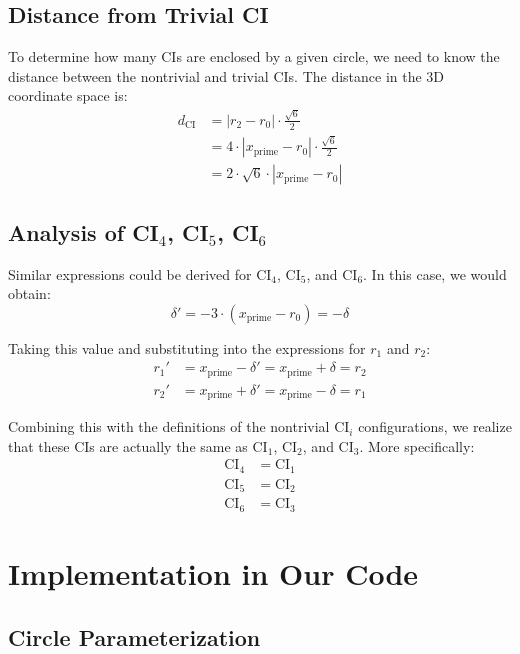 \documentclass{article}
\begin{document}
\subsection{Distance from Trivial CI}

To determine how many CIs are enclosed by a given circle, we need to know the distance between the nontrivial and trivial CIs. The distance in the 3D coordinate space is:
\begin{align}
d_{\text{CI}} &= |r_2 - r_0| \cdot \frac{\sqrt{6}}{2} \\
&= 4 \cdot |x_{\text{prime}} - r_0| \cdot \frac{\sqrt{6}}{2} \\
&= 2 \cdot \sqrt{6} \cdot |x_{\text{prime}} - r_0|
\end{align}

\subsection{Analysis of CI$_4$, CI$_5$, CI$_6$}

Similar expressions could be derived for $\text{CI}_4$, $\text{CI}_5$, and $\text{CI}_6$. In this case, we would obtain:
\begin{equation}
\delta' = -3 \cdot (x_{\text{prime}} - r_0) = -\delta
\end{equation}

Taking this value and substituting into the expressions for $r_1$ and $r_2$:
\begin{align}
r_1' &= x_{\text{prime}} - \delta' = x_{\text{prime}} + \delta = r_2 \\
r_2' &= x_{\text{prime}} + \delta' = x_{\text{prime}} - \delta = r_1
\end{align}

Combining this with the definitions of the nontrivial $\text{CI}_i$ configurations, we realize that these CIs are actually the same as $\text{CI}_1$, $\text{CI}_2$, and $\text{CI}_3$. More specifically:
\begin{align}
\text{CI}_4 &= \text{CI}_1 \\
\text{CI}_5 &= \text{CI}_2 \\
\text{CI}_6 &= \text{CI}_3
\end{align}

\section{Implementation in Our Code}

\subsection{Circle Parameterization}
\end{document}
